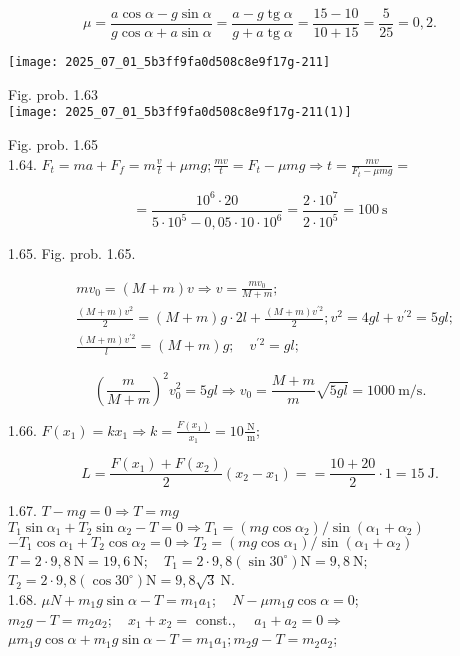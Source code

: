 $$
\mu=\frac{a \cos \alpha-g \sin \alpha}{g \cos \alpha+a \sin \alpha}=\frac{a-g \operatorname{tg} \alpha}{g+a \operatorname{tg} \alpha}=\frac{15-10}{10+15}=\frac{5}{25}=0,2 .
$$

\begin{center}
\texttt{[image: 2025\_07\_01\_5b3ff9fa0d508c8e9f17g-211]}
\end{center}

Fig. prob. 1.63\\
\texttt{[image: 2025\_07\_01\_5b3ff9fa0d508c8e9f17g-211(1)]}

Fig. prob. 1.65\\
1.64. $F_{t}=m a+F_{f}=m \frac{v}{t}+\mu m g ; \frac{m v}{t}=F_{t}-\mu m g \Rightarrow t=\frac{m v}{F_{t}-\mu m g}=$

$$
=\frac{10^{6} \cdot 20}{5 \cdot 10^{5}-0,05 \cdot 10 \cdot 10^{6}}=\frac{2 \cdot 10^{7}}{2 \cdot 10^{5}}=100 \mathrm{~s}
$$

1.65. Fig. prob. 1.65.

$$
\begin{aligned}
& m v_{0}=(M+m) v \Rightarrow v=\frac{m v_{0}}{M+m} ; \\
& \frac{(M+m) v^{2}}{2}=(M+m) g \cdot 2 l+\frac{(M+m) v^{\prime 2}}{2} ; v^{2}=4 g l+v^{\prime 2}=5 g l ; \\
& \frac{(M+m) v^{\prime 2}}{l}=(M+m) g ; \quad v^{\prime 2}=g l ;
\end{aligned}
$$

$$
\left(\frac{m}{M+m}\right)^{2} v_{0}^{2}=5 g l \Rightarrow v_{0}=\frac{M+m}{m} \sqrt{5 g l}=1000 \mathrm{~m} / \mathrm{s} .
$$

1.66. $F\left(x_{1}\right)=k x_{1} \Rightarrow k=\frac{F\left(x_{1}\right)}{x_{1}}=10 \frac{\mathrm{~N}}{\mathrm{~m}}$;

$$
L=\frac{F\left(x_{1}\right)+F\left(x_{2}\right)}{2}\left(x_{2}-x_{1}\right)==\frac{10+20}{2} \cdot 1=15 \mathrm{~J} .
$$

1.67. $T-m g=0 \Rightarrow T=m g$\\
$T_{1} \sin \alpha_{1}+T_{2} \sin \alpha_{2}-T=0 \Rightarrow T_{1}=\left(m g \cos \alpha_{2}\right) / \sin \left(\alpha_{1}+\alpha_{2}\right)$\\
$-T_{1} \cos \alpha_{1}+T_{2} \cos \alpha_{2}=0 \Rightarrow T_{2}=\left(m g \cos \alpha_{1}\right) / \sin \left(\alpha_{1}+\alpha_{2}\right)$\\
$T=2 \cdot 9,8 \mathrm{~N}=19,6 \mathrm{~N} ; \quad T_{1}=2 \cdot 9,8\left(\sin 30^{\circ}\right) \mathrm{N}=9,8 \mathrm{~N}$; $T_{2}=2 \cdot 9,8\left(\cos 30^{\circ}\right) \mathrm{N}=9,8 \sqrt{3} \mathrm{~N}$.\\
1.68. $\mu N+m_{1} g \sin \alpha-T=m_{1} a_{1} ; \quad N-\mu m_{1} g \cos \alpha=0$;\\
$m_{2} g-T=m_{2} a_{2} ; \quad x_{1}+x_{2}=$ const., $\quad a_{1}+a_{2}=0 \Rightarrow$\\
$\mu m_{1} g \cos \alpha+m_{1} g \sin \alpha-T=m_{1} a_{1} ; m_{2} g-T=m_{2} a_{2}$;

